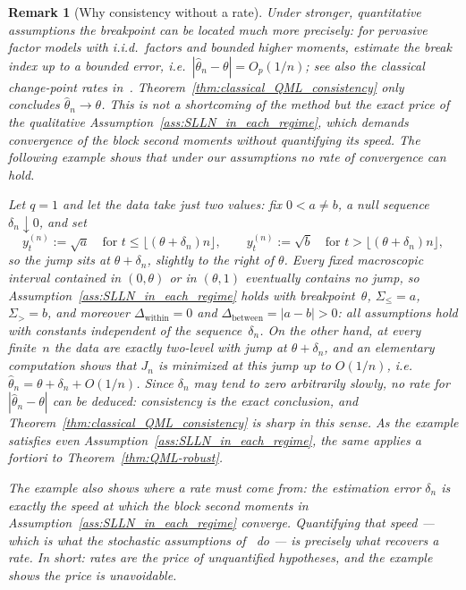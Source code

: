 \documentclass[10pt, letterpaper]{amsart}
\newtheorem{remark}[theorem]{Remark}
\begin{document}
\begin{remark}[Why consistency without a rate]\label{rem:no_rate}
Under stronger, quantitative assumptions the breakpoint can be located much more precisely: for pervasive factor models with i.i.d.\ factors and bounded higher moments, \cite{DuanBaiHan2023} estimate the break index up to a bounded error, i.e.\ $|\hat\theta_n-\theta|=O_p(1/n)$; see also the classical change-point rates in~\cite{Hinkley1970,Bai1997}. Theorem~\ref{thm:classical_QML_consistency} only concludes $\hat\theta_n\to\theta$. This is not a shortcoming of the method but the exact price of the qualitative Assumption~\ref{ass:SLLN_in_each_regime}, which demands convergence of the block second moments without quantifying its speed. The following example shows that under our assumptions no rate of convergence can hold.

Let $q=1$ and let the data take just two values: fix $0<a\neq b$, a null sequence $\delta_n\downarrow0$, and set
\[
y_t^{(n)}:=\sqrt a \quad\text{for } t\leq\lfloor(\theta+\delta_n)n\rfloor,
\qquad
y_t^{(n)}:=\sqrt b \quad\text{for } t>\lfloor(\theta+\delta_n)n\rfloor,
\]
so the jump sits at $\theta+\delta_n$, slightly to the right of $\theta$. Every fixed macroscopic interval contained in $(0,\theta)$ or in $(\theta,1)$ eventually contains no jump, so Assumption~\ref{ass:SLLN_in_each_regime} holds with breakpoint~$\theta$, $\Sigma_\leq=a$, $\Sigma_>=b$, and moreover $\Delta_{\mathrm{within}}=0$ and $\Delta_{\mathrm{between}}=|a-b|>0$: all assumptions hold with constants independent of the sequence~$\delta_n$. On the other hand, at every finite~$n$ the data are exactly two-level with jump at $\theta+\delta_n$, and an elementary computation shows that $J_n$ is minimized at this jump up to $O(1/n)$, i.e.\ $\hat\theta_n=\theta+\delta_n+O(1/n)$. Since $\delta_n$ may tend to zero arbitrarily slowly, no rate for $|\hat\theta_n-\theta|$ can be deduced: consistency is the exact conclusion, and Theorem~\ref{thm:classical_QML_consistency} is sharp in this sense. As the example satisfies even Assumption~\ref{ass:SLLN_in_each_regime}, the same applies a fortiori to Theorem~\ref{thm:QML-robust}.

The example also shows where a rate must come from: the estimation error $\delta_n$ is exactly the speed at which the block second moments in Assumption~\ref{ass:SLLN_in_each_regime} converge. Quantifying that speed --- which is what the stochastic assumptions of~\cite{DuanBaiHan2023} do --- is precisely what recovers a rate. In short: rates are the price of unquantified hypotheses, and the example shows the price is unavoidable.
\end{remark}
\end{document}
